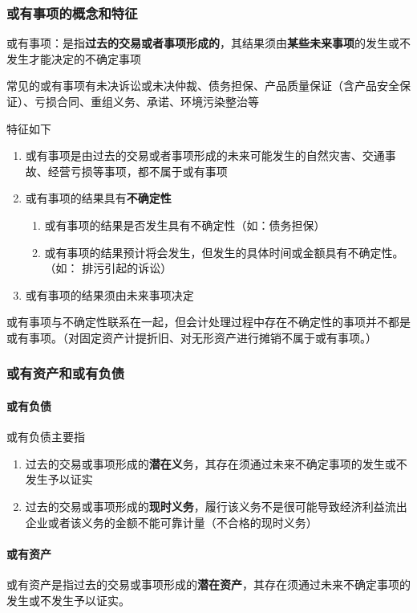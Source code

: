 \documentclass[UTF8,12pt]{ctexart}
\numberwithin{equation}{section} %
\numberwithin{figure}{section}
\numberwithin{table}{section}
\begin{document}
	\subsubsection{或有事项的概念和特征}
	或有事项：是指\textbf{过去的交易或者事项形成的}，其结果须由\textbf{某些未来事项}的发生或不发生才能决定的不确定事项
	
	常见的或有事项有未决诉讼或未决仲裁、债务担保、产品质量保证（含产品安全保证）、亏损合同、重组义务、承诺、环境污染整治等
	
	特征如下
	\begin{enumerate}
		\item 或有事项是由过去的交易或者事项形成的未来可能发生的自然灾害、交通事故、经营亏损等事项，都不属于或有事项
		
		\item 或有事项的结果具有\textbf{不确定性}
		\begin{enumerate}
			\item 或有事项的结果是否发生具有不确定性（如：债务担保）
			
			\item 或有事项的结果预计将会发生，但发生的具体时间或金额具有不确定性。（如：  排污引起的诉讼）
		\end{enumerate}
		
		\item 或有事项的结果须由未来事项决定
	\end{enumerate}

	或有事项与不确定性联系在一起，但会计处理过程中存在不确定性的事项并不都是或有事项。（对固定资产计提折旧、对无形资产进行摊销不属于或有事项。）
	
	\subsubsection{或有资产和或有负债}
	\paragraph{或有负债}
	或有负债主要指
	\begin{enumerate}
		\item 过去的交易或事项形成的\textbf{潜在义}务，其存在须通过未来不确定事项的发生或不发生予以证实
		
		\item 过去的交易或事项形成的\textbf{现时义务}，履行该义务不是很可能导致经济利益流出企业或者该义务的金额不能可靠计量（不合格的现时义务）
	\end{enumerate}
	
	\paragraph{或有资产}
	或有资产是指过去的交易或事项形成的\textbf{潜在资产}，其存在须通过未来不确定事项的发生或不发生予以证实。
	
\end{document}
